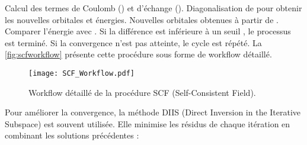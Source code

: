 {}\markdownRendererUlBeginTight
\markdownRendererUlItem Calcul des termes de Coulomb () et d'échange ().\markdownRendererUlItemEnd 
\markdownRendererUlEndTight \markdownRendererOlItemEnd 
{}\markdownRendererInterblockSeparator
{}\markdownRendererUlBeginTight
\markdownRendererUlItem Diagonalisation de  pour obtenir les nouvelles orbitales et énergies.\markdownRendererUlItemEnd 
\markdownRendererUlEndTight \markdownRendererOlItemEnd 
{}\markdownRendererInterblockSeparator
{}\markdownRendererUlBeginTight
\markdownRendererUlItem Nouvelles orbitales  obtenues à partir de .\markdownRendererUlItemEnd 
\markdownRendererUlEndTight \markdownRendererOlItemEnd 
{}\markdownRendererInterblockSeparator
{}\markdownRendererUlBeginTight
\markdownRendererUlItem Comparer l'énergie  avec . Si la différence est inférieure à un seuil \markdownRendererInlineMath{\delta}, le processus est terminé.\markdownRendererUlItemEnd 
\markdownRendererUlEndTight \markdownRendererOlItemEnd 
{} Si la convergence n’est pas atteinte, le cycle est répété.\markdownRendererOlItemEnd 
\markdownRendererOlEndTight \markdownRendererInterblockSeparator
{}La \autoref{fig:scfworkflow} présente cette procédure sous forme de workflow détaillé.\markdownRendererParagraphSeparator
{}\begin{figure}[tbh]\markdownRendererSoftLineBreak
{}\centering\markdownRendererSoftLineBreak
{}\texttt{[image: SCF\_Workflow.pdf]}\markdownRendererSoftLineBreak
{}\caption{Workflow détaillé de la procédure SCF (Self-Consistent Field).}\markdownRendererSoftLineBreak
{}\label{fig:scfworkflow}\markdownRendererSoftLineBreak
{}\end{figure}\markdownRendererInterblockSeparator
{}
\markdownRendererSectionEnd 
\markdownRendererSectionEnd \markdownRendererSectionBegin
{}\markdownRendererInterblockSeparator
{}Pour améliorer la convergence, la méthode DIIS (Direct Inversion in the Iterative Subspace) est souvent utilisée. Elle minimise les résidus de chaque itération en combinant les solutions précédentes :\markdownRendererSoftLineBreak

